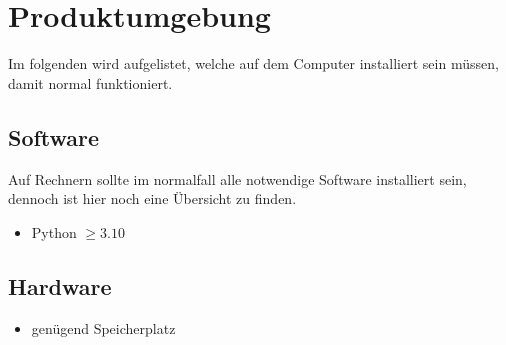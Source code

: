 \chapter{Produktumgebung}
Im folgenden wird aufgelistet, welche  auf dem Computer installiert sein müssen, damit \e  normal funktioniert.\\

\section{Software}
Auf Rechnern sollte im normalfall alle notwendige Software installiert sein, dennoch ist hier noch eine Übersicht zu finden.

\begin{itemize}
	\item Python $ \geq 3.10$
\end{itemize}

\section{Hardware}
\begin{itemize}
	\item genügend Speicherplatz
\end{itemize}
